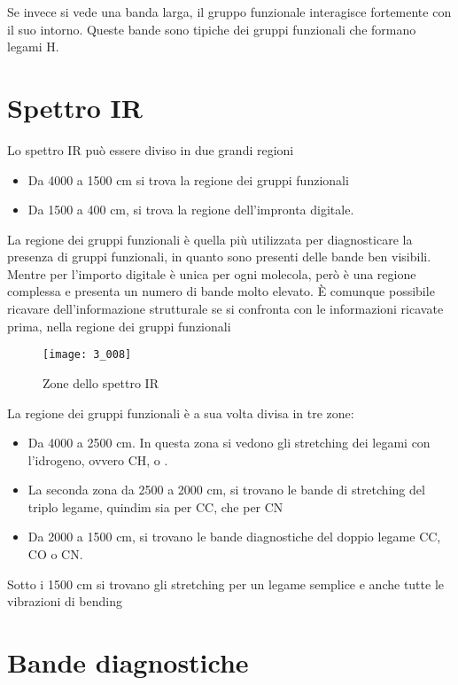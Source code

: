 Se invece si vede una banda larga, il gruppo funzionale interagisce
fortemente con il suo intorno. Queste bande sono tipiche dei gruppi
funzionali che formano legami H.

\vfill
\clearpage

\section{Spettro IR}

Lo spettro IR può essere diviso in due grandi regioni
\begin{itemize}
\item Da 4000 a 1500 cm si trova la regione dei gruppi funzionali
\item Da 1500 a 400 cm, si trova la regione dell'impronta digitale.
\end{itemize}

La regione dei gruppi funzionali è quella più utilizzata per
diagnosticare la presenza di gruppi funzionali, in quanto sono presenti
delle bande ben visibili. Mentre per l'importo digitale è unica per ogni
molecola, però è una regione complessa e presenta un numero di bande
molto elevato. È comunque possibile ricavare dell'informazione
strutturale se si confronta con le informazioni ricavate prima, nella
regione dei gruppi funzionali

\begin{figure}[H]
    \texttt{[image: 3\_008]}
    \caption{Zone dello spettro IR}
\end{figure}

La regione dei gruppi funzionali è a sua volta divisa in tre zone:
\begin{itemize}
\item Da 4000 a 2500 cm. In questa zona si vedono gli stretching dei legami con
l'idrogeno, ovvero CH,  o .
\item La seconda zona da 2500 a 2000 cm, si trovano le bande di stretching del triplo legame, quindim sia per CC, che per CN
\item Da 2000 a 1500 cm, si trovano le bande diagnostiche del doppio legame CC, CO o CN.
\end{itemize}

Sotto i 1500 cm si trovano gli stretching per un legame semplice e anche
tutte le vibrazioni di bending

\section{Bande diagnostiche}

